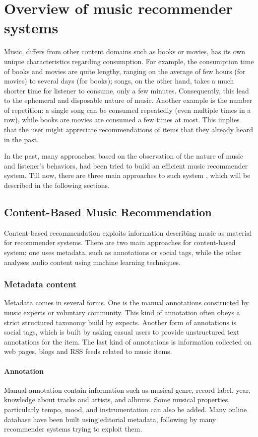 \section{Overview of music recommender systems}
Music, differs from other content domains such as books or movies, has its own unique characteristics regarding consumption. For example, the consumption time of books and movies are quite lengthy, ranging on the average of few hours (for movies) to several days (for books); songs, on the other hand, takes a much shorter time for listener to consume, only a few minutes. Consequently, this lead to the ephemeral and disposable nature of music. Another example is the number of repetition: a single song can be consumed repeatedly (even multiple times in a row), while books are movies are consumed a few times at most. This implies that the user might appreciate recommendations of items that they already heard in the past.

In the past, many approaches, based on the observation of the nature of music and listener's behaviors, had been tried to build an efficient music recommender system. Till now, there are three main approaches to such system \cite{ricci2011introduction}, which will be described in the following sections. 

\subsection{Content-Based Music Recommendation}

Content-based recommendation exploits information describing music as material for recommender systems. There are two main approaches for content-based system: one uses metadata, such as annotations or social tags, while the other analyses audio content using machine learning techniques.

\subsubsection{Metadata content}
Metadata comes in several forms. One is the manual annotations constructed by music experts or voluntary community. This kind of annotation often obeys a strict structured taxonomy build by expects. Another form of annotations is social tags, which is built by asking casual users to provide unstructured text annotations for the item. The last kind of annotations is information collected on web pages, blogs and RSS feeds related to music items.

\paragraph{Annotation} 
Manual annotation contain information such as musical genre, record label, year, knowledge about tracks and artists, and albums. Some musical properties, particularly tempo, mood, and instrumentation can also be added. Many online database have been built using editorial metadata, following by many recommender systems trying to exploit them. 

